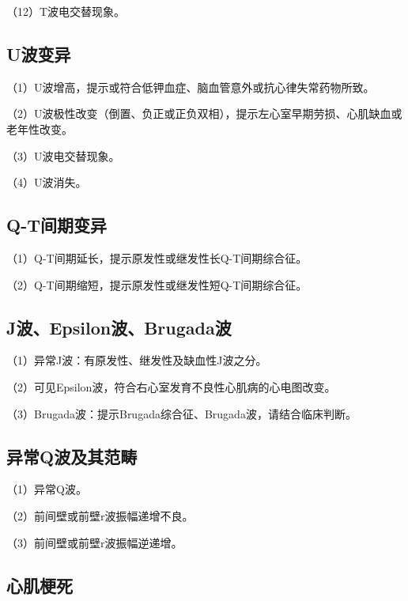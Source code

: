 （12）T波电交替现象。

\protect\hypertarget{text00057.htmlux5cux23subid685}{}{}

\subsection{U波变异}

（1）U波增高，提示或符合低钾血症、脑血管意外或抗心律失常药物所致。

（2）U波极性改变（倒置、负正或正负双相），提示左心室早期劳损、心肌缺血或老年性改变。

（3）U波电交替现象。

（4）U波消失。

\protect\hypertarget{text00057.htmlux5cux23subid686}{}{}

\subsection{Q-T间期变异}

（1）Q-T间期延长，提示原发性或继发性长Q-T间期综合征。

（2）Q-T间期缩短，提示原发性或继发性短Q-T间期综合征。

\protect\hypertarget{text00057.htmlux5cux23subid687}{}{}

\subsection{J波、Epsilon波、Brugada波}

（1）异常J波：有原发性、继发性及缺血性J波之分。

（2）可见Epsilon波，符合右心室发育不良性心肌病的心电图改变。

（3）Brugada波：提示Brugada综合征、Brugada波，请结合临床判断。

\protect\hypertarget{text00057.htmlux5cux23subid688}{}{}

\subsection{异常Q波及其范畴}

（1）异常Q波。

（2）前间壁或前壁r波振幅递增不良。

（3）前间壁或前壁r波振幅逆递增。

\protect\hypertarget{text00057.htmlux5cux23subid689}{}{}

\subsection{心肌梗死}

